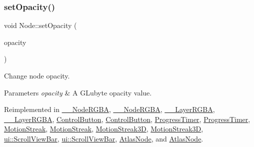 \subsubsection{\texorpdfstring{set\+Opacity()}{setOpacity()}\hspace{0.1cm}{\footnotesize\ttfamily [1/2]}}
{\footnotesize\ttfamily void Node\+::set\+Opacity (\begin{DoxyParamCaption}\item[{G\+Lubyte}]{opacity }\end{DoxyParamCaption})\hspace{0.3cm}{\ttfamily [virtual]}}

Change node opacity. 
\begin{DoxyParams}{Parameters}
{\em opacity} & A G\+Lubyte opacity value. \\
\hline
\end{DoxyParams}


Reimplemented in \hyperlink{class____NodeRGBA_aa0ac4f9dca25f519f175e668ba4f3306}{\+\_\+\+\_\+\+Node\+R\+G\+BA}, \hyperlink{class____NodeRGBA_aa0ac4f9dca25f519f175e668ba4f3306}{\+\_\+\+\_\+\+Node\+R\+G\+BA}, \hyperlink{class____LayerRGBA_a1b172623ee7486835fd189672d19d8d7}{\+\_\+\+\_\+\+Layer\+R\+G\+BA}, \hyperlink{class____LayerRGBA_a1b172623ee7486835fd189672d19d8d7}{\+\_\+\+\_\+\+Layer\+R\+G\+BA}, \hyperlink{classControlButton_adfe6c80adc5ba24d50d21f5ff742f6a1}{Control\+Button}, \hyperlink{classControlButton_aa6076ef32569a9be5361f12bf00d4aa1}{Control\+Button}, \hyperlink{classProgressTimer_a757eb314cc8f4633c6e5e240b2e6a4e8}{Progress\+Timer}, \hyperlink{classProgressTimer_a9f36a7fde3a6490b81e53f23ebbd3df9}{Progress\+Timer}, \hyperlink{classMotionStreak_af5d9d6c438239621c6931d312a92fcec}{Motion\+Streak}, \hyperlink{classMotionStreak_a7240b2a7e1340cf0139774421b7ca80e}{Motion\+Streak}, \hyperlink{classMotionStreak3D_aaf983644b09cefdf815a650c7cfd426a}{Motion\+Streak3D}, \hyperlink{classMotionStreak3D_aebd12e84f982bb11ab3cc3c92e769f73}{Motion\+Streak3D}, \hyperlink{classui_1_1ScrollViewBar_a89da6d683d0157d90c93b559e90c69e3}{ui\+::\+Scroll\+View\+Bar}, \hyperlink{classui_1_1ScrollViewBar_a89da6d683d0157d90c93b559e90c69e3}{ui\+::\+Scroll\+View\+Bar}, \hyperlink{classAtlasNode_af95a54e5d5157983414cad3d837853eb}{Atlas\+Node}, and \hyperlink{classAtlasNode_a396e36e894a70722806e90c7101207bc}{Atlas\+Node}.

\mbox{\label{classNode_add84cdfdadeb8862c2149a57a565017c}} 
